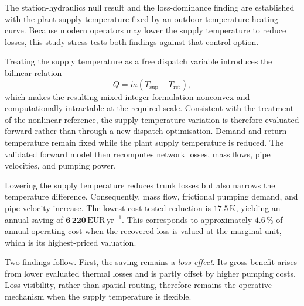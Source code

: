 \documentclass[a4paper,fleqn]{cas-sc}
\begin{document}
The station-hydraulics null result and the loss-dominance finding are established
with the plant supply temperature fixed by an outdoor-temperature heating curve.
Because modern operators may lower the supply temperature to reduce losses, this
study stress-tests both findings against that control option.

Treating the supply temperature as a free dispatch variable introduces the
bilinear relation
\[
    Q = \dot{m}\left(T_{\mathrm{sup}} - T_{\mathrm{ret}}\right),
\]
which makes the resulting mixed-integer formulation nonconvex and computationally
intractable at the required scale. Consistent with the treatment of the nonlinear
reference, the supply-temperature variation is therefore evaluated forward rather
than through a new dispatch optimisation. Demand and return temperature remain
fixed while the plant supply temperature is reduced. The validated forward model
then recomputes network losses, mass flows, pipe velocities, and pumping power.

Lowering the supply temperature reduces trunk losses but also narrows the
temperature difference. Consequently, mass flow, frictional pumping demand, and
pipe velocity increase. The lowest-cost tested reduction is
\(\mathbf{17.5}\,\mathrm{K}\), yielding an annual saving of
\(\mathbf{6\,220}\,\mathrm{EUR}\,\mathrm{yr}^{-1}\). This corresponds to
approximately \(\mathbf{4.6}\,\%\) of annual operating cost when the recovered
loss is valued at the marginal unit, which is its highest-priced valuation.

Two findings follow. First, the saving remains a \emph{loss effect}. Its gross
benefit arises from lower evaluated thermal losses and is partly offset by higher
pumping costs. Loss visibility, rather than spatial routing, therefore remains the
operative mechanism when the supply temperature is flexible.
\end{document}
